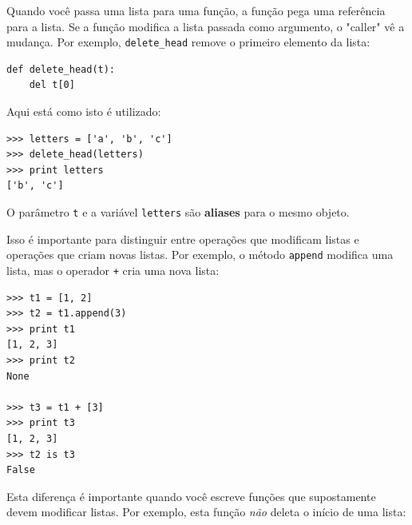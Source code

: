 Quando você passa uma lista para uma função, a função pega uma referência para a lista.
Se a função modifica a lista passada como argumento, o "caller" vê a mudança.
Por exemplo, \verb"delete_head" remove o primeiro elemento da lista:

\beforeverb
\begin{verbatim}
def delete_head(t):
    del t[0]
\end{verbatim}
\afterverb
%
Aqui está como isto é utilizado:

\beforeverb
\begin{verbatim}
>>> letters = ['a', 'b', 'c']
>>> delete_head(letters)
>>> print letters
['b', 'c']
\end{verbatim}
\afterverb
%

O parâmetro {\tt t} e a variável {\tt letters} são {\bf aliases} para o mesmo objeto.

Isso é importante para distinguir entre operações que modificam listas e operações que criam novas listas.
Por exemplo, o método {\tt append} modifica uma lista, mas o operador {\tt +} cria uma nova lista:



\beforeverb
\begin{verbatim}
>>> t1 = [1, 2]
>>> t2 = t1.append(3)
>>> print t1
[1, 2, 3]
>>> print t2
None

>>> t3 = t1 + [3]
>>> print t3
[1, 2, 3]
>>> t2 is t3
False
\end{verbatim}
\afterverb

Esta diferença é importante quando você escreve funções que supostamente devem modificar listas.
Por exemplo, esta função \emph{não} deleta o início de uma lista:

